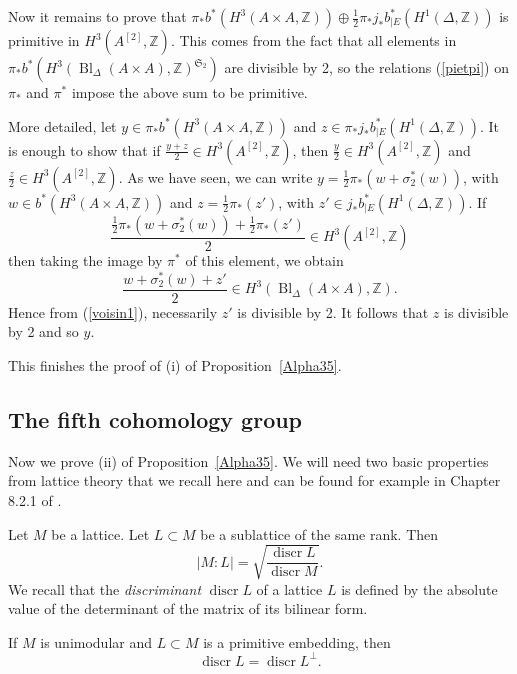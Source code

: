 \documentclass{alggeom}
\DeclareMathOperator{\discr}{discr}
\DeclareMathOperator{\Bl}{Bl}
\newcommand{\DP}{:}
\newcommand{\Z}{\mathbb{Z}}
\theoremstyle{plain}
\theoremstyle{definition}
\theoremstyle{remark}
\begin{document}
Now it remains to prove that $\pi_{*}b^{*}(H^{3}(A\times A,\Z))\oplus \frac{1}{2}\pi_{*}j_*b_{|E}^{*}(H^{1}(\Delta,\Z))$ is primitive in $H^{3}(A^{[2]},\Z)$.
This comes from the fact that all elements in $\pi_{*}b^{*}(H^{3}(\Bl_\Delta(A\! \times\! A),\Z)^{\mathfrak{S}_2})$ are divisible by 2, so the relations (\ref{pietpi}) on $\pi_*$ and $\pi^*$ impose the above sum to be primitive.  

More detailed, let $y\in \pi_*b^{*}(H^{3}(A\times A,\Z))$ and $z\in \pi_*j_*b_{|E}^{*}(H^{1}(\Delta,\Z))$. It is enough to show that if $\frac{y+z}{2}\in H^{3}(A^{[2]},\Z)$, then $\frac{y}{2}\in H^{3}(A^{[2]},\Z)$ and $\frac{z}{2}\in H^{3}(A^{[2]},\Z)$.
As we have seen, we can write $y=\frac{1}{2}\pi_*(w+\sigma_{2}^{*}(w))$, with $w\in b^{*}(H^{3}(A\times A,\Z))$ and $z=\frac{1}{2}\pi_*(z')$, with $z'\in j_*b_{|E}^{*}(H^{1}(\Delta,\Z))$. If $$\frac{\frac{1}{2}\pi_*(w+\sigma_{2}^{*}(w))+\frac{1}{2}\pi_*(z')}{2}\in H^{3}(A^{[2]},\Z)$$ then taking the image by $\pi^{*}$ of this element, we obtain $$\frac{w+\sigma_{2}^{*}(w)+z'}{2}\in H^{3}(\Bl_\Delta(A\! \times\! A),\Z).$$ 
Hence from (\ref{voisin1}), necessarily $z'$ is divisible by 2. It follows that $z$ is divisible by 2 and so $y$.

This finishes the proof of (i) of Proposition~\ref{Alpha35}.
\subsection{The fifth cohomology group}\label{d5}
Now we prove (ii) of Proposition~\ref{Alpha35}.
We will need two basic properties from lattice theory that we recall here and can be found for example in
Chapter 8.2.1 of \cite{Dolgachev}.

Let $M$ be a lattice. Let $L\subset M$ be a sublattice of the same rank. 
Then 
\begin{equation}
|M\DP L|=\sqrt{\frac{\discr L}{\discr M}}.
\label{squareDiscr}
\end{equation}
We recall that the \emph{discriminant} $\discr L$ of a lattice $L$
is defined by the absolute value of the determinant of the matrix of its bilinear form. 

If $M$ is unimodular and $L\subset M$ is a primitive embedding, then 
\begin{equation}
\discr L = \discr L^\perp.
\label{discrOrthPrim}
\end{equation}
\end{document}
